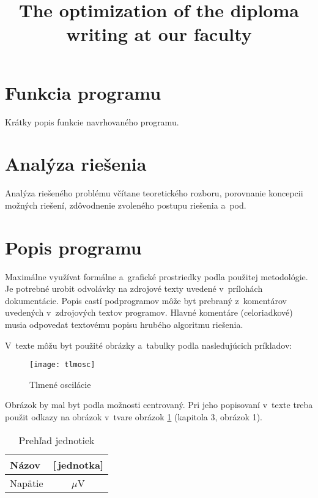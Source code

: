 \documentclass[a4paper]{systemovaPrirucka}
\title{The optimization of the diploma writing at our faculty}
\begin{document}

\titulnastrana
\tableofcontents
\newpage
\setcounter{page}{1}
\listoffigures
\newpage
{}
\listoftables

\newpage\section{Funkcia programu}

Krátky popis funkcie navrhovaného programu.

\newpage\section{Analýza riešenia}

Analýza riešeného problému včítane teoretického rozboru, porovnanie koncepcii možných
riešení, zdôvodnenie zvoleného postupu riešenia a~pod.

\newpage\section{Popis programu}

Maximálne využívat formálne a~grafické prostriedky podla použitej metodológie.
Je potrebné urobit odvolávky na zdrojové texty uvedené v~prílohách dokumentácie. Popis
castí podprogramov môže byt prebraný  z~komentárov uvedených v~zdrojových textov
programov. Hlavné komentáre (celoriadkové) musia odpovedat textovému popisu hrubého 
algoritmu riešenia.

V~texte môžu byt použité obrázky a~tabulky podla nasledujúcich príkladov:

\begin{figure}[!ht]
\centering 
\texttt{[image: tlmosc]}
\caption{Tlmené oscilácie}\label{o:1}
\end{figure}

Obrázok by mal byt podla možnosti centrovaný. Pri jeho popisovaní v~texte treba použit odkazy na obrázok v~tvare obrázok \ref{o:1}  (kapitola 3, obrázok 1).

\begin{table}[!ht]\caption{Prehľad jednotiek}\label{t:1}
\smallskip
\centering
\begin{tabular}{|l|c|} \hline
Názov	& [\,jednotka] \\ \hline
Napätie & $\mu$V \\ \hline
\end{tabular}	
\end{table}
\end{document}
